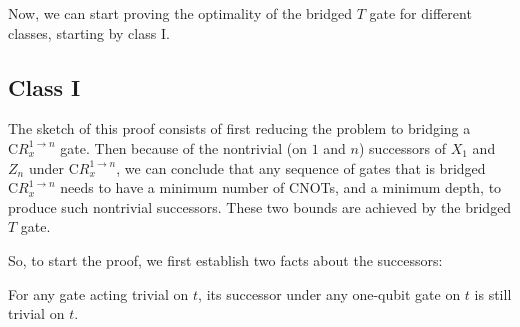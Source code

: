 Now, we can start proving the optimality of the bridged $T$ gate for different classes, starting by class I.

\subsection{Class I}

The sketch of this proof consists of first reducing the problem to bridging a $\mathrm{C}R_x^{1\to n}$ gate. Then because of the nontrivial (on $1$ and $n$) successors of $X_1$ and $Z_n$ under $\mathrm{C}R_x^{1\to n}$, we can conclude that any sequence of gates that is bridged $\mathrm{C}R_x^{1\to n}$ needs to have a minimum number of CNOTs, and a minimum depth, to produce such nontrivial successors. These two bounds are achieved by the bridged $T$ gate.

So, to start the proof, we first establish two facts about the successors:
\begin{corollary}\label{cor:no-go-one-qubit}
  For any gate acting trivial on $t$, its successor under any one-qubit gate on $t$ is still trivial on $t$. 
\end{corollary}

